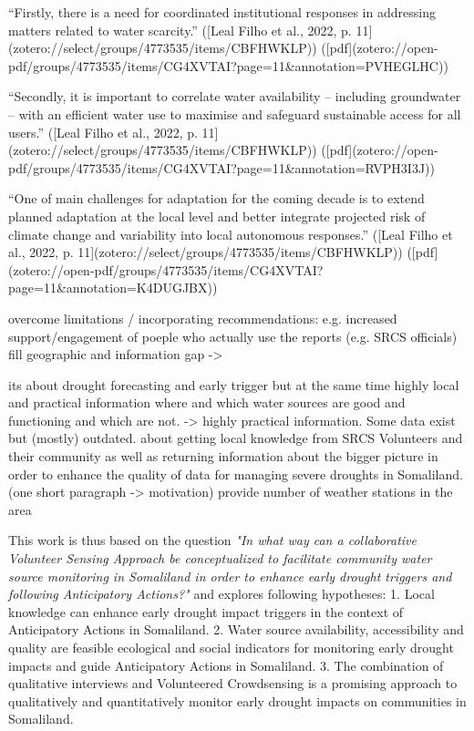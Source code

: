 “Firstly, there is a need for coordinated institutional responses in addressing matters related to water scarcity.” ([Leal Filho et al., 2022, p. 11](zotero://select/groups/4773535/items/CBFHWKLP)) ([pdf](zotero://open-pdf/groups/4773535/items/CG4XVTAI?page=11&annotation=PVHEGLHC))

“Secondly, it is important to correlate water availability – including groundwater – with an efficient water use to maximise and safeguard sustainable access for all users.” ([Leal Filho et al., 2022, p. 11](zotero://select/groups/4773535/items/CBFHWKLP)) ([pdf](zotero://open-pdf/groups/4773535/items/CG4XVTAI?page=11&annotation=RVPH3I3J))

“One of main challenges for adaptation for the coming decade is to extend planned adaptation at the local level and better integrate projected risk of climate change and variability into local autonomous responses.” ([Leal Filho et al., 2022, p. 11](zotero://select/groups/4773535/items/CBFHWKLP)) ([pdf](zotero://open-pdf/groups/4773535/items/CG4XVTAI?page=11&annotation=K4DUGJBX))



overcome limitations / incorporating recommendations: e.g. increased support/engagement of poeple who actually use the reports (e.g. SRCS officials) 
fill geographic and information gap ->

its about drought forecasting and early trigger but at the same time highly local and practical information where and which water sources are good and functioning and which are not. -> highly practical information. Some data exist but (mostly) outdated.
about getting local knowledge from SRCS Volunteers and their community as well as returning information about the bigger picture
in order to enhance the quality of data for managing severe droughts in Somaliland. (one short paragraph -> motivation)
provide number of weather stations in the area


This work is thus based on the question \textit{"In what way can a collaborative Volunteer Sensing Approach be conceptualized to facilitate community water source monitoring in Somaliland in order to enhance early drought triggers and following Anticipatory Actions?"} and explores following hypotheses:
1. Local knowledge can enhance early drought impact triggers in the context of Anticipatory Actions in Somaliland.
2. Water source availability, accessibility and quality are feasible ecological and social indicators for monitoring early drought impacts and guide Anticipatory Actions in Somaliland.
3. The combination of qualitative interviews and Volunteered Crowdsensing is a promising approach to qualitatively and quantitatively monitor early drought impacts on communities in Somaliland.



